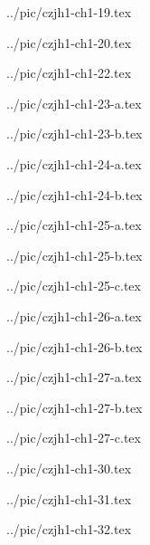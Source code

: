 

../pic/czjh1-ch1-19.tex



../pic/czjh1-ch1-20.tex



../pic/czjh1-ch1-22.tex



../pic/czjh1-ch1-23-a.tex



../pic/czjh1-ch1-23-b.tex



../pic/czjh1-ch1-24-a.tex



../pic/czjh1-ch1-24-b.tex



../pic/czjh1-ch1-25-a.tex



../pic/czjh1-ch1-25-b.tex



../pic/czjh1-ch1-25-c.tex



../pic/czjh1-ch1-26-a.tex



../pic/czjh1-ch1-26-b.tex



../pic/czjh1-ch1-27-a.tex



../pic/czjh1-ch1-27-b.tex



../pic/czjh1-ch1-27-c.tex



../pic/czjh1-ch1-30.tex



../pic/czjh1-ch1-31.tex



../pic/czjh1-ch1-32.tex




